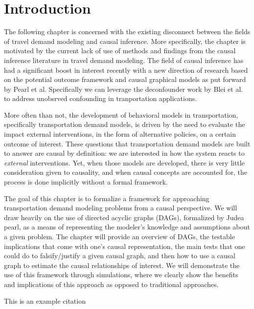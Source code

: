 \section{Introduction}
The following chapter is concerned with the existing disconnect between the fields of travel demand modeling and causal inference. More specifically, the chapter is motivated by the current lack of use of methods and findings from the causal inference literature in travel demand modeling. The field of causal inference has had a significant boost in interest recently with a new direction of research based on the potential outcome framework and causal graphical models as put forward by Pearl et al. Specifically we can leverage the deconfounder work by Blei et al. to address unobsrved confounding in tranportation applications.

More often than not, the development of behavioral models in transportation, specifically transportation demand models, is driven by the need to evaluate the impact external interventions, in the form of alternative policies, on a certain outcome of interest. These questions that transportation demand models are built to answer are causal by definition: we are interested in how the system reacts to \textit{external} interventions. Yet, when those models are developed, there is very little consideration given to causality, and when causal concepts are accounted for, the process is done implicitly without a formal framework. 

The goal of this chapter is to formalize a framework for approaching transportation demand modeling problems from a causal perspective. We will draw heavily on the use of directed acyclic graphs (DAGs), formalized by Judea pearl, as a means of representing the modeler's knowledge and assumptions about a given problem. The chapter will provide an overview of DAGs, the testable implications that come with one's causal representation, the main tests that one could do to falsify/justify a given causal graph, and then how to use a causal graph to estimate the causal relationships of interest. We will demonstrate the use of this framework through simulations, where we clearly show the benefits and implications of this approach as opposed to traditional approaches. 



\blindtext[2]

This is an example citation \cite{brathwaite_2018_causal}
